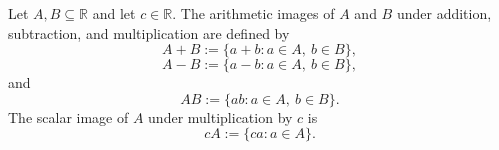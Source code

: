 \begin{definition}
\label{def:set-arithmetic-images}
Let $A,B\subseteq\mathbb{R}$ and let $c\in\mathbb{R}$.  The arithmetic
images of $A$ and $B$ under addition, subtraction, and multiplication are
defined by
\[
  A+B:=\{a+b:a\in A,\ b\in B\},
\]
\[
  A-B:=\{a-b:a\in A,\ b\in B\},
\]
and
\[
  AB:=\{ab:a\in A,\ b\in B\}.
\]
The scalar image of $A$ under multiplication by $c$ is
\[
  cA:=\{ca:a\in A\}.
\]
\end{definition}